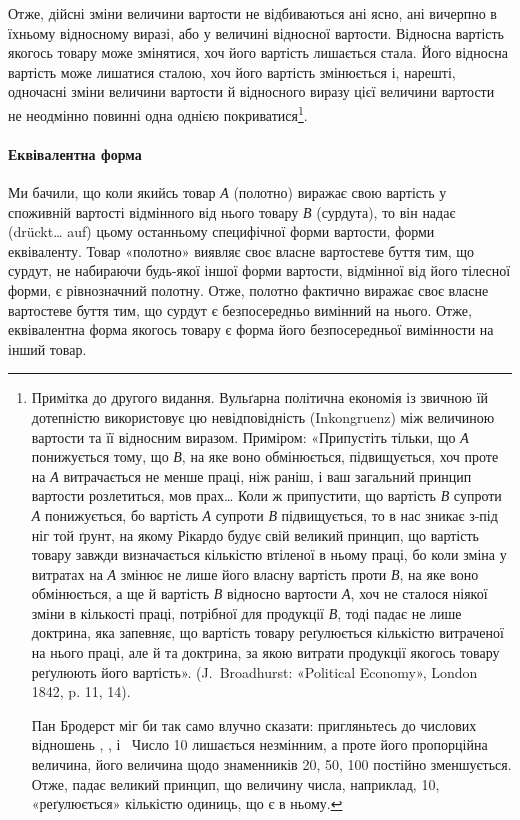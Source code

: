 Отже, дійсні зміни величини вартости не відбиваються ані
ясно, ані вичерпно в їхньому відносному виразі, або у величині
відносної вартости. Відносна вартість якогось товару може змінятися,
хоч його вартість лишається стала. Його відносна вартість
може лишатися сталою, хоч його вартість змінюється і, нарешті,
одночасні зміни величини вартости й відносного виразу
цієї величини вартости не неодмінно повинні одна однією покриватися\footnote{
Примітка до другого видання. Вульґарна політична економія
із звичною їй дотепністю використовує цю невідповідність (Inkongruenz)
між величиною вартости та її відносним виразом. Приміром: «Припустіть
тільки, що \emph{А} понижується тому, що \emph{В}, на яке воно обмінюється,
підвищується, хоч проте на \emph{А} витрачається не менше праці, ніж раніш, і
ваш загальний принцип вартости розлетиться, мов прах\dots{} Коли ж припустити,
що вартість \emph{В} супроти \emph{А} понижується, бо вартість \emph{А} супроти
\emph{В} підвищується, то в нас зникає з-під ніг той ґрунт, на якому Рікардо
будує свій великий принцип, що вартість товару завжди визначається
кількістю втіленої в ньому праці, бо коли зміна у витратах на \emph{А} змінює
не лише його власну вартість проти \emph{В}, на яке воно обмінюється, а ще й
вартість \emph{В} відносно вартости \emph{А}, хоч не сталося ніякої зміни в
кількості праці, потрібної для продукції \emph{В}, тоді падає не лише доктрина,
яка запевняє, що вартість товару реґулюється кількістю витраченої на нього
праці, але й та доктрина, за якою витрати продукції якогось товару реґулюють
його вартість». (J.~Broadhurst: «Political Economy», London 1842, p. 11, 14).

Пан Бродерст міг би так само влучно сказати: пригляньтесь до числових відношень
, , і~ Число 10 лишається
незмінним, а проте його пропорційна величина, його величина щодо знаменників
20, 50, 100 постійно зменшується. Отже, падає великий принцип, що величину числа,
наприклад, 10, «реґулюється» кількістю одиниць, що є в ньому.
}.
\paragraph{Еквівалентна форма}

Ми бачили, що коли якийсь товар \emph{А} (полотно) виражає свою вартість у споживній вартості відмінного
від нього товару \emph{В} (сурдута), то він надає (drückt\dots{} auf) цьому останньому специфічної форми
вартости, форми еквіваленту. Товар «полотно» виявляє своє власне вартостеве буття тим, що сурдут, не
набираючи будь-якої іншої форми вартости, відмінної від його тілесної форми, є рівнозначний полотну.
Отже, полотно фактично виражає своє власне вартостеве буття тим, що сурдут є безпосередньо вимінний
на нього. Отже, еквівалентна форма якогось товару є форма його безпосередньої вимінности на інший
товар.

